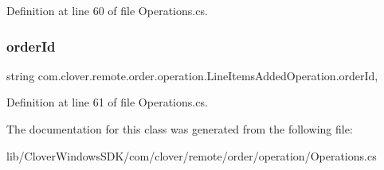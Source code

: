 Definition at line 60 of file Operations.\+cs.

\mbox{\label{classcom_1_1clover_1_1remote_1_1order_1_1operation_1_1_line_items_added_operation_a3d210c422f722cef34c52d606a01d6f0}} 
\subsubsection{\texorpdfstring{order\+Id}{orderId}}
{\footnotesize\ttfamily string com.\+clover.\+remote.\+order.\+operation.\+Line\+Items\+Added\+Operation.\+order\+Id\hspace{0.3cm}{\ttfamily [get]}, {\ttfamily [set]}}



Definition at line 61 of file Operations.\+cs.



The documentation for this class was generated from the following file\+:\begin{DoxyCompactItemize}
\item 
lib/\+Clover\+Windows\+S\+D\+K/com/clover/remote/order/operation/Operations.\+cs\end{DoxyCompactItemize}
